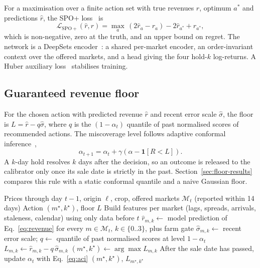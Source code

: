 For a maximisation over a finite action set with true revenues $r$, optimum $a^*$ and predictions $\hat r$, the SPO+ loss~\cite{elmachtoub2022} is
\begin{equation}
\mathcal{L}_{\mathrm{SPO+}}(\hat r,r)=\max_{a}\,(2\hat r_a-r_a)-2\hat r_{a^*}+r_{a^*},
\label{eq:spo}
\end{equation}
which is non-negative, zero at the truth, and an upper bound on regret. The network is a DeepSets encoder~\cite{zaheer2017}: a shared per-market encoder, an order-invariant context over the offered markets, and a head giving the four hold-$k$ log-returns. A Huber auxiliary loss~\cite{huber1964} stabilises training.

\subsection{Guaranteed revenue floor}
\label{sec:floors}

For the chosen action with predicted revenue $\hat r$ and recent error scale $\hat\sigma$, the floor is $L=\hat r-q\hat\sigma$, where $q$ is the $(1-\alpha_t)$ quantile of past normalised scores of recommended actions. The miscoverage level follows adaptive conformal inference~\cite{gibbs2021},
\begin{equation}
\alpha_{t+1}=\alpha_t+\gamma\left(\alpha-\mathbf{1}[R<L]\right).
\label{eq:aci}
\end{equation}
A $k$-day hold resolves $k$ days after the decision, so an outcome is released to the calibrator only once its sale date is strictly in the past. Section~\ref{sec:floor-results} compares this rule with a static conformal quantile and a naive Gaussian floor.

\begin{algorithm}[!t]
\caption{Recommendation with a verified floor}
\label{alg:recommend}
\begin{algorithmic}[1]
\Require Prices through day $t-1$, origin $\ell$, crop, offered markets $\mathcal{M}_t$ (reported within 14 days)
\Ensure Action $(m^\star,k^\star)$, floor $L$
\State Build features per market (lags, spreads, arrivals, staleness, calendar) using only data before $t$
\State $\hat r_{m,k}\gets$ model prediction of Eq.~\ref{eq:revenue} for every $m\in\mathcal M_t,\,k\in\{0..3\}$, plus farm gate
\State $\hat\sigma_{m,k}\gets$ recent error scale; $q\gets$ quantile of past normalised scores at level $1-\alpha_t$
\State $L_{m,k}\gets\hat r_{m,k}-q\,\hat\sigma_{m,k}$ 
\State $(m^\star,k^\star)\gets\arg\max L_{m,k}$
\State After the sale date has passed, update $\alpha_t$ with Eq.~\ref{eq:aci}
\State \Return $(m^\star,k^\star)$, $L_{m^\star,k^\star}$
\end{algorithmic}
\end{algorithm}

